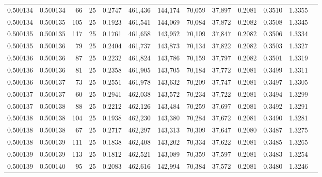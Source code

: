 \begin{tabular}{rrrrrrrrrrrrr}
0.500134 & 0.500134 &  66 &  25 &                                     0.2747 & 461,436 & 144,174 &  70,059 &  37,897 & 0.2081 & 0.3510 & 1.3355 \\
0.500134 & 0.500135 & 105 &  25 &                                     0.1923 & 461,541 & 144,069 &  70,084 &  37,872 & 0.2082 & 0.3508 & 1.3345 \\
0.500135 & 0.500135 & 117 &  25 &                                     0.1761 & 461,658 & 143,952 &  70,109 &  37,847 & 0.2082 & 0.3506 & 1.3334 \\
0.500135 & 0.500136 &  79 &  25 &                                     0.2404 & 461,737 & 143,873 &  70,134 &  37,822 & 0.2082 & 0.3503 & 1.3327 \\
0.500136 & 0.500136 &  87 &  25 &                                     0.2232 & 461,824 & 143,786 &  70,159 &  37,797 & 0.2082 & 0.3501 & 1.3319 \\
0.500136 & 0.500136 &  81 &  25 &                                     0.2358 & 461,905 & 143,705 &  70,184 &  37,772 & 0.2081 & 0.3499 & 1.3311 \\
0.500136 & 0.500137 &  73 &  25 &                                     0.2551 & 461,978 & 143,632 &  70,209 &  37,747 & 0.2081 & 0.3497 & 1.3305 \\
0.500137 & 0.500137 &  60 &  25 &                                     0.2941 & 462,038 & 143,572 &  70,234 &  37,722 & 0.2081 & 0.3494 & 1.3299 \\
0.500137 & 0.500138 &  88 &  25 &                                     0.2212 & 462,126 & 143,484 &  70,259 &  37,697 & 0.2081 & 0.3492 & 1.3291 \\
0.500138 & 0.500138 & 104 &  25 &                                     0.1938 & 462,230 & 143,380 &  70,284 &  37,672 & 0.2081 & 0.3490 & 1.3281 \\
0.500138 & 0.500138 &  67 &  25 &                                     0.2717 & 462,297 & 143,313 &  70,309 &  37,647 & 0.2080 & 0.3487 & 1.3275 \\
0.500138 & 0.500139 & 111 &  25 &                                     0.1838 & 462,408 & 143,202 &  70,334 &  37,622 & 0.2081 & 0.3485 & 1.3265 \\
0.500139 & 0.500139 & 113 &  25 &                                     0.1812 & 462,521 & 143,089 &  70,359 &  37,597 & 0.2081 & 0.3483 & 1.3254 \\
0.500139 & 0.500140 &  95 &  25 &                                     0.2083 & 462,616 & 142,994 &  70,384 &  37,572 & 0.2081 & 0.3480 & 1.3246 \\

\end{tabular}
